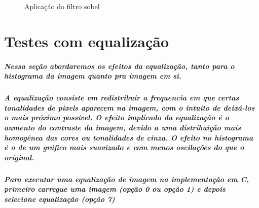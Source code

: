 \documentclass[12pt,fleqn]{article}
\begin{document}
  \begin{figure}[!htb]
  \centering
  \caption{Aplicação do filtro sobel}
  \label{fig:Resultado 1}
  \end{figure}

\newpage

\section{Testes com equalização}

  \subparagraph{\normalfont Nessa seção abordaremos os efeitos da equalização, tanto para o histograma da imagem quanto pra imagem em si.}
  \subparagraph{\normalfont A equalização consiste em redistribuir a frequencia em que certas tonalidades de pixels aparecem na imagem, com o intuito de deixá-los o mais próximo possível.
  O efeito implicado da equalização é o aumento do contraste da imagem, devido a uma distribuição mais homogênea das cores ou tonalidades de cinza. O efeito no histograma é 
  o de um gráfico mais suavizado e com menos oscilações do que o original.}

  \subparagraph{\normalfont Para executar uma equalização de imagem na implementação em C, primeiro carregue uma imagem (opção 0 ou opção 1) e depois selecione equalização (opção 7)}
\end{document}
